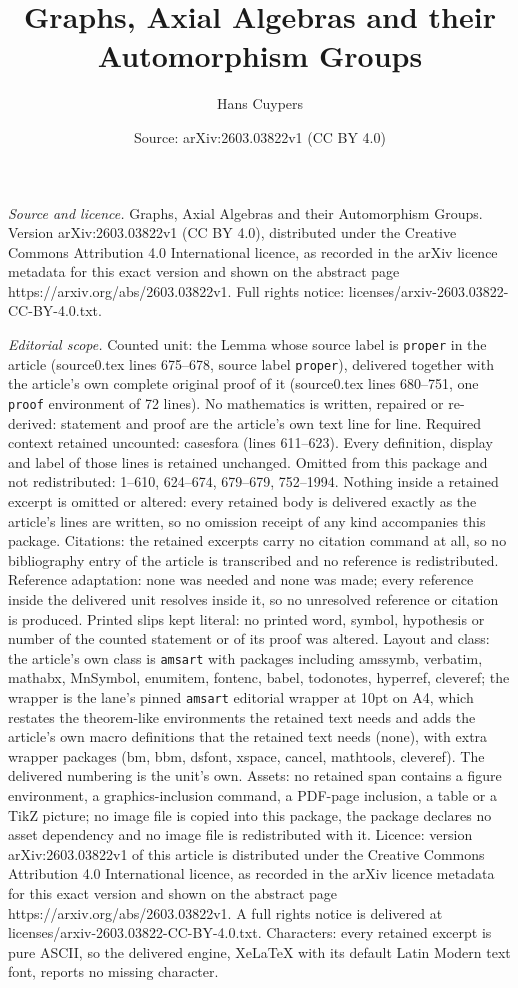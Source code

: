 \documentclass[10pt,a4paper]{amsart}
\title[Graphs, Axial Algebras and their Automorphism Groups]{Graphs, Axial Algebras and their Automorphism Groups}
\author{Hans Cuypers}
\date{Source: arXiv:2603.03822v1 (CC BY 4.0)}
\begin{document}
\maketitle

\noindent\emph{Source and licence.} Graphs, Axial Algebras and their Automorphism Groups. Version arXiv:2603.03822v1 (CC BY 4.0), distributed under the Creative Commons Attribution 4.0 International licence, as recorded in the arXiv licence metadata for this exact version and shown on the abstract page https://arxiv.org/abs/2603.03822v1. Full rights notice: licenses/arxiv-2603.03822-CC-BY-4.0.txt.\par\smallskip

\noindent\textit{Editorial scope.} Counted unit: the Lemma whose source label is \texttt{proper} in the article (source0.tex lines 675--678, source label \texttt{proper}), delivered together with the article's own complete original proof of it (source0.tex lines 680--751, one \texttt{proof} environment of 72 lines). No mathematics is written, repaired or re-derived: statement and proof are the article's own text line for line. Required context retained uncounted: casesfora (lines 611--623). Every definition, display and label of those lines is retained unchanged. Omitted from this package and not redistributed: 1--610, 624--674, 679--679, 752--1994. Nothing inside a retained excerpt is omitted or altered: every retained body is delivered exactly as the article's lines are written, so no omission receipt of any kind accompanies this package. Citations: the retained excerpts carry no citation command at all, so no bibliography entry of the article is transcribed and no reference is redistributed. Reference adaptation: none was needed and none was made; every reference inside the delivered unit resolves inside it, so no unresolved reference or citation is produced. Printed slips kept literal: no printed word, symbol, hypothesis or number of the counted statement or of its proof was altered. Layout and class: the article's own class is \texttt{amsart} with packages including amssymb, verbatim, mathabx, MnSymbol, enumitem, fontenc, babel, todonotes, hyperref, cleveref; the wrapper is the lane's pinned \texttt{amsart} editorial wrapper at 10pt on A4, which restates the theorem-like environments the retained text needs and adds the article's own macro definitions that the retained text needs (none), with extra wrapper packages (bm, bbm, dsfont, xspace, cancel, mathtools, cleveref). The delivered numbering is the unit's own. Assets: no retained span contains a figure environment, a graphics-inclusion command, a PDF-page inclusion, a table or a TikZ picture; no image file is copied into this package, the package declares no asset dependency and no image file is redistributed with it. Licence: version arXiv:2603.03822v1 of this article is distributed under the Creative Commons Attribution 4.0 International licence, as recorded in the arXiv licence metadata for this exact version and shown on the abstract page https://arxiv.org/abs/2603.03822v1. A full rights notice is delivered at licenses/arxiv-2603.03822-CC-BY-4.0.txt. Characters: every retained excerpt is pure ASCII, so the delivered engine, XeLaTeX with its default Latin Modern text font, reports no missing character.
\end{document}
